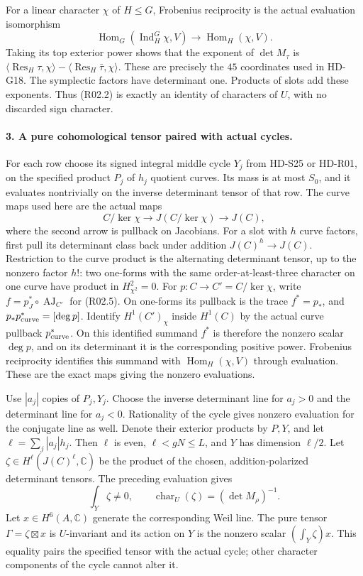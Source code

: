 For a linear character $\chi$ of $H\le G$, Frobenius reciprocity is
the actual evaluation isomorphism
\[
 \operatorname{Hom}_G(\operatorname{Ind}_H^G\chi,V)
          \longrightarrow\operatorname{Hom}_H(\chi,V).
\]
Taking its top exterior power shows that the exponent of
$\det M_\tau$ is
$\langle\operatorname{Res}_H\tau,\chi\rangle-
 \langle\operatorname{Res}_H\bar\tau,\chi\rangle$.
These are precisely the $45$ coordinates used in HD-G18.
The symplectic factors have determinant one. Products of slots add
these exponents. Thus (R02.2) is exactly an identity of characters
of $U$, with no discarded sign character.

\paragraph{3. A pure cohomological tensor paired with actual cycles.}
For each row choose its signed integral middle cycle $Y_j$ from
HD-S25 or HD-R01, on the specified product $P_j$ of $h_j$ quotient
curves. Its mass is at most $S_0$, and it evaluates nontrivially on
the inverse determinant tensor of that row. The curve maps used
here are the actual maps
\[
 C/\ker\chi\longrightarrow J(C/\ker\chi)
                      \longrightarrow J(C),          \tag{R02.5}
\]
where the second arrow is pullback on Jacobians.
For a slot with $h$ curve factors, first pull its determinant class
back under addition $J(C)^h\to J(C)$. Restriction to the curve
product is the alternating determinant tensor, up to the nonzero
factor $h!$: two one-forms with the same order-at-least-three
character on one curve have product in $H^2_{\chi^2}=0$.
For $p:C\to C'=C/\ker\chi$, write $f=p_J^*\circ
\operatorname{AJ}_{C'}$ for (R02.5). On one-forms its pullback
is the trace $f^*=p_*$, and $p_*p_{\rm curve}^*=[\deg p]$.
Identify $H^1(C')_\chi$ inside $H^1(C)$ by the actual curve
pullback $p_{\rm curve}^*$. On this identified summand $f^*$ is
therefore the nonzero scalar $\deg p$, and on its determinant
it is the corresponding positive power. Frobenius reciprocity
identifies this summand with $\operatorname{Hom}_H(\chi,V)$
through evaluation. These are the exact maps giving the nonzero
evaluations.

Use $|a_j|$ copies of $P_j,Y_j$. Choose the inverse determinant
line for $a_j>0$ and the determinant line for $a_j<0$.
Rationality of the cycle gives nonzero evaluation for the conjugate
line as well. Denote their exterior products by $P,Y$, and let
$\ell=\sum_j|a_j|h_j$. Then $\ell$ is even, $\ell<gN\le L$,
and $Y$ has dimension $\ell/2$.
Let $\zeta\in H^\ell(J(C)^\ell,\mathbb C)$ be the product of the
chosen, addition-polarized determinant tensors. The preceding
evaluation gives
\[
                \int_Y\zeta\ne0,
       \qquad \operatorname{char}_U(\zeta)
                              =(\det M_\rho)^{-1}.    \tag{R02.6}
\]
Let $x\in H^6(A,\mathbb C)$ generate the corresponding Weil line.
The pure tensor $\Gamma=\zeta\boxtimes x$ is $U$-invariant and
its action on $Y$ is the nonzero scalar
$(\int_Y\zeta)x$.
This equality pairs the specified tensor with the actual cycle;
other character components of the cycle cannot alter it.


